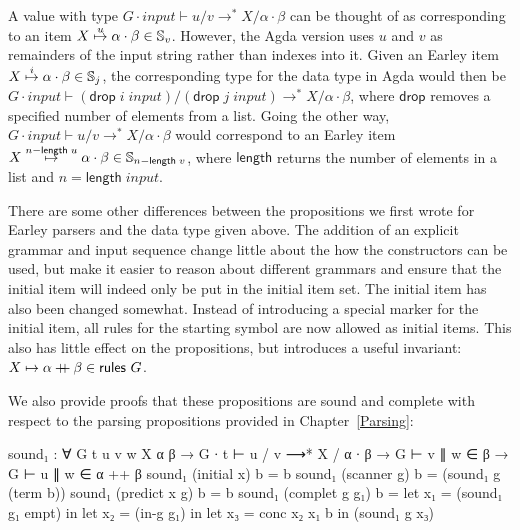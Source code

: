 \newcommand{\tdrop}{\mathsf{drop}}
\newcommand{\tlength}{\mathsf{length}}
\newcommand{\vinput}{\mathit{input}}
\newcommand{\rslash}{\mathrel{{}/{}}}


		A value with type $G \cdot \vinput \vdash u \rslash v \rightarrow^* X
		\rslash \alpha \cdot \beta$ can be thought of as corresponding to an item
		$X\overset{u}{\mapsto}\alpha\cdot\beta \in \mathbb{S}_v$. However, the Agda
		version uses $u$ and $v$ as remainders of the input string rather than
		indexes into it.  Given an Earley item {$X\overset{i}{\mapsto}\alpha\cdot\beta
		\in \mathbb{S}_j$, the corresponding type for the data type in Agda
		would then be $G \cdot \vinput \vdash
		(\tdrop\;i\;\vinput) \rslash (\tdrop\;j\;\vinput)
		\rightarrow^* X \rslash \alpha \cdot \beta$, where $\tdrop$ removes a specified number of
		elements from a list. Going the other way, $G \cdot \vinput
		\vdash u \rslash v \rightarrow^* X \rslash \alpha \cdot \beta$ would correspond to
		an Earley item $\earley{X}{\alpha}{\beta}{n -
		\tlength\;u} \in \mathbb{S}_{n -
		\tlength\;v}$}, where $\tlength$ returns the number of
		elements in a list and $n = \tlength\;\vinput$.

		There are some other differences between the propositions we first
		wrote for Earley parsers and the data type given above. The addition of
		an explicit grammar and input sequence change little about the how the
		constructors can be used, but make it easier to reason about different
		grammars and ensure that the initial item will indeed only be put in
		the initial item set. The initial item has also been changed somewhat.
		Instead of introducing a special marker for the initial item, all rules
		for the starting symbol are now allowed as initial items.  This also
		has little effect on the propositions, but introduces a useful
		invariant: $X \mapsto \alpha \mathbin{{+}\mspace{-8mu}{+}} \beta \in \textsf{rules } G$.

		We also provide proofs that these propositions are sound and complete
		with respect to the parsing propositions provided in
		Chapter~\ref{Parsing}:

		\begin{code}
			sound₁ : ∀ {G t u v w X α β} →
			  G ∙ t ⊢ u / v ⟶* X / α ∙ β →
			    G ⊢ v ∥ w ∈ β →
			    G ⊢ u ∥ w ∈ α ++ β
			sound₁ (initial x)     b = b
			sound₁ (scanner g)     b = (sound₁ g (term b))
			sound₁ (predict x g)   b = b
			sound₁ (complet g g₁)  b =
			  let x₁ = (sound₁ g₁ empt) in
			  let x₂ = (in-g g₁) in
			  let x₃ = conc x₂ x₁ b in
			  (sound₁ g x₃)
		\end{code}

